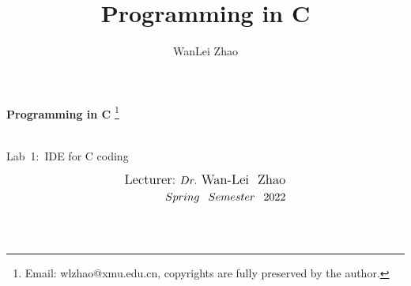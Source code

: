 \documentclass[t]{beamer}
\title{Programming in C}
\author{WanLei Zhao}
\newcommand\blfootnote[1]{
  \begingroup
  \renewcommand\thefootnote{}\footnote{#1}
  \addtocounter{footnote}{-1}
  \endgroup
}
\begin{document}
\begin{frame}
   \begin{center}
    \vspace{24pt}
    \Huge\textbf{Programming in C}\blfootnote{Email: wlzhao@xmu.edu.cn, copyrights are fully preserved by the author.}\\
     \Huge{\mbox{Lab 1: }IDE for C coding}
    \vspace{36pt}
  \end{center}
  \begin{align*}
   \vspace{18pt}
      \large{\mbox{Lecturer:}~Dr.~\mbox{Wan-Lei~~Zhao}} \\
      \large{Spring~~Semester~~2022} \\
   \vspace{30pt}
  \end{align*}
\end{frame}




\section{}
\end{document}
